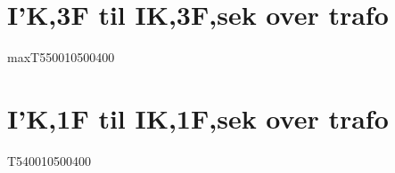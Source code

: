\documentclass[11pt]{report}
\begin{document}
\section{I'K,3F til IK,3F,sek over trafo}
\begin{HV@I'K,3F=>IK,3F,sek@trafo}{max}{T5}{500}{10500}{400}%
\end{HV@I'K,3F=>IK,3F,sek@trafo}

\section{I'K,1F til IK,1F,sek over trafo}
\begin{HV@I'K,FN=>IK,FN,sek@trafo}{T5}{400}{10500}{400}%
\end{HV@I'K,FN=>IK,FN,sek@trafo}
\end{document}
